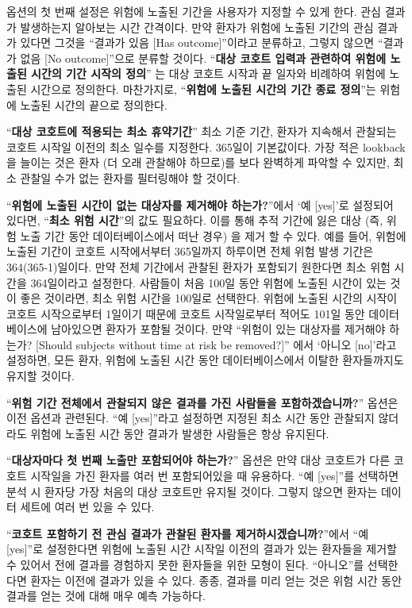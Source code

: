 \documentclass[11pt]{book}
\theoremstyle{definition}
\theoremstyle{definition}
\theoremstyle{definition}
\theoremstyle{remark}
\begin{document}
옵션의 첫 번째 설정은 위험에 노출된 기간을 사용자가 지정할 수 있게 한다.
관심 결과가 발생하는지 알아보는 시간 간격이다. 만약 환자가 위험에 노출된
기간의 관심 결과가 있다면 그것을 ``결과가 있음 {[}Has outcome{]}''이라고
분류하고, 그렇지 않으면 ``결과가 없음 {[}No outcome{]}''으로 분류할
것이다. ``\textbf{대상 코호트 입력과 관련하여 위험에 노출된 시간의 기간
시작의 정의}'' 는 대상 코호트 시작과 끝 일자와 비례하여 위험에 노출된
시간으로 정의한다. 마찬가지로, ``\textbf{위험에 노출된 시간의 기간 종료
정의}''는 위험에 노출된 시간의 끝으로 정의한다.

``\textbf{대상 코호트에 적용되는 최소 휴약기간}'' 최소 기준 기간, 환자가
지속해서 관찰되는 코호트 시작일 이전의 최소 일수를 지정한다. 365일이
기본값이다. 가장 적은 lookback을 늘이는 것은 환자 (더 오래 관찰해야
하므로)를 보다 완벽하게 파악할 수 있지만, 최소 관찰일 수가 없는 환자를
필터링해야 할 것이다.

``\textbf{위험에 노출된 시간이 없는 대상자를 제거해야 하는가?}''에서 `예
{[}yes{]}'로 설정되어 있다면, ``\textbf{최소 위험 시간}''의 값도
필요하다. 이를 통해 추적 기간에 잃은 대상 (즉, 위험 노출 기간 동안
데이터베이스에서 떠난 경우) 을 제거 할 수 있다. 예를 들어, 위험에 노출된
기간이 코호트 시작에서부터 365일까지 하루이면 전체 위험 발생 기간은
364(365-1)일이다. 만약 전체 기간에서 관찰된 환자가 포함되기 원한다면
최소 위험 시간을 364일이라고 설정한다. 사람들이 처음 100일 동안 위험에
노출된 시간이 있는 것이 좋은 것이라면, 최소 위험 시간을 100일로
선택한다. 위험에 노출된 시간의 시작이 코호트 시작으로부터 1일이기 때문에
코호트 시작일로부터 적어도 101일 동안 데이터베이스에 남아있으면 환자가
포함될 것이다. 만약 ``위험이 있는 대상자를 제거해야 하는가? {[}Should
subjects without time at risk be removed?{]}'' 에서 `아니오
{[}no{]}'라고 설정하면, 모든 환자, 위험에 노출된 시간 동안
데이터베이스에서 이탈한 환자들까지도 유지할 것이다.

``\textbf{위험 기간 전체에서 관찰되지 않은 결과를 가진 사람들을
포함하겠습니까?}'' 옵션은 이전 옵션과 관련된다. ``예 {[}yes{]}''라고
설정하면 지정된 최소 시간 동안 관찰되지 않더라도 위험에 노출된 시간 동안
결과가 발생한 사람들은 항상 유지된다.

``\textbf{대상자마다 첫 번째 노출만 포함되어야 하는가?}'' 옵션은 만약
대상 코호트가 다른 코호트 시작일을 가진 환자를 여러 번 포함되어있을 때
유용하다. ``예 {[}yes{]}''를 선택하면 분석 시 환자당 가장 처음의 대상
코호트만 유지될 것이다. 그렇지 않으면 환자는 데이터 세트에 여러 번 있을
수 있다.

``\textbf{코호트 포함하기 전 관심 결과가 관찰된 환자를
제거하시겠습니까?}''에서 ``예 {[}yes{]}''로 설정한다면 위험에 노출된
시간 시작일 이전의 결과가 있는 환자들을 제거할 수 있어서 전에 결과를
경험하지 못한 환자들을 위한 모형이 된다. ``아니오''를 선택한다면 환자는
이전에 결과가 있을 수 있다. 종종, 결과를 미리 얻는 것은 위험 시간 동안
결과를 얻는 것에 대해 매우 예측 가능하다.
\end{document}
